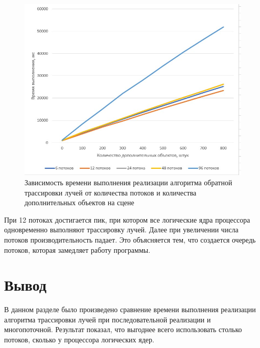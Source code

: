 \begin{figure}[H]
	\centering
	\includegraphics{inc/img/comp_fig}
	\caption{Зависимость времени выполнения реализации алгоритма обратной трассировки лучей от количества потоков и количества дополнительных объектов на сцене}
	\label{fig:compfig}
\end{figure}

При 12 потоках достигается пик, при котором все логические ядра процессора одновременно выполняют трассировку лучей. Далее при увеличении числа потоков производительность падает. Это объясняется тем, что создается очередь потоков, которая замедляет работу программы.

\section*{Вывод}

В данном разделе было произведено сравнение времени выполнения реализации алгоритма трассировки лучей при последовательной реализации и многопоточной. Результат показал, что выгоднее всего использовать столько потоков, сколько у процессора логических ядер.

